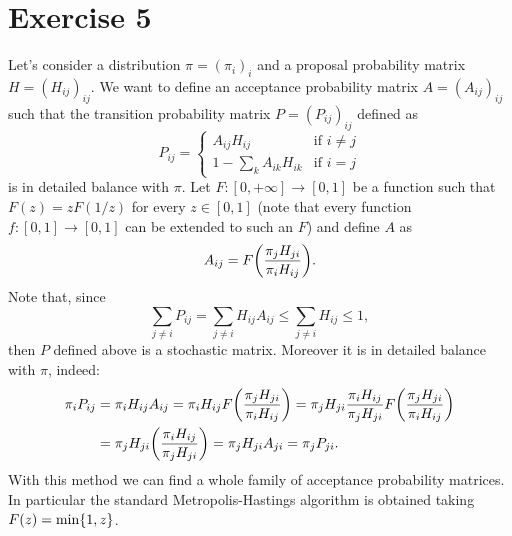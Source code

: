 \documentclass[a4paper,11pt]{article}
\theoremstyle{definition}
\theoremstyle{plain}
\theoremstyle{remark}
\DeclarePairedDelimiter{\parr}{(}{)}
\DeclarePairedDelimiter{\bra}{\lbrace}{\rbrace}
\begin{document}
\section*{Exercise 5}

Let's consider a distribution $\pi=(\pi_i)_i$ and a proposal probability matrix $H=(H_{ij})_{ij}$. We want to define an acceptance probability matrix $A=(A_{ij})_{ij}$ such that the transition probability matrix $P=(P_{ij})_{ij}$ defined as 
$$
P_{ij} = \left\lbrace\begin{array}{ll}
A_{ij}H_{ij} & \text{if } i\neq j \\
1 - \sum_kA_{ik}H_{ik} & \text{if } i=j
\end{array}\right.
$$ 
is in detailed balance with $\pi$. Let $F:[0,+\infty]\to[0,1]$ be a function such that
$F(z)=zF(1/z)$ for every $z\in[0,1]$ (note that every function $f:[0,1]\to[0,1]$ can be extended to such an $F$) and define $A$ as
$$
A_{ij} = F\parr*{\frac{\pi_jH_{ji}}{\pi_iH_{ij}}}.
$$
Note that, since
$$
\sum_{j\neq i} P_{ij} = \sum_{j\neq i} H_{ij}A_{ij} \leq \sum_{j\neq i} H_{ij} \leq 1,
$$
then $P$ defined above is a stochastic matrix. Moreover it is in detailed balance with $\pi$, indeed:
\begin{align*}
\pi_iP_{ij} & = \pi_iH_{ij}A_{ij} = \pi_iH_{ij}F\parr*{\frac{\pi_jH_{ji}}{\pi_iH_{ij}}} = \pi_jH_{ji}\frac{\pi_iH_{ij}}{\pi_jH_{ji}}F\parr*{\frac{\pi_jH_{ji}}{\pi_iH_{ij}}} \\ & = \pi_jH_{ji}\parr*{\frac{\pi_iH_{ij}}{\pi_jH_{ji}}} = \pi_jH_{ji}A_{ji} = \pi_jP_{ji}.
\end{align*}
With this method we can find a whole family of acceptance probability matrices. In particular the standard Metropolis-Hastings algorithm is obtained taking 
$F(z)=\min\bra{1,z}$.
\end{document}
